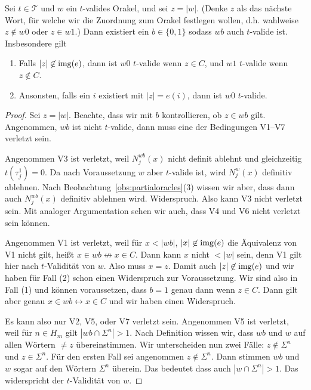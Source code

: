 \begin{lemma}\label{claim:oracle-up-extension}
    Sei $t\in\mathcal T$ und $w$ ein $t$-valides Orakel, und sei $z=|w|$. 
    (Denke $z$ als das nächste Wort, für welche wir die Zuordnung zum Orakel festlegen wollen, d.h. wahlweise $z\not\in w0$ oder $z\in w1$.)
    Dann existiert ein $b\in\{0,1\}$ sodass $wb$ auch $t$-valide ist.
    Insbesondere gilt
    \begin{enumerate}
        \item Falls $|z|\not\in\operatorname{img}(e)$, dann ist $w0$ $t$-valide wenn $z\in C$, und $w1$ $t$-valide wenn $z\not\in C$.
        \item Ansonsten, falls ein $i$ existiert mit $|z|=e(i)$, dann ist $w0$ $t$-valide.
    \end{enumerate}
\end{lemma}
\begin{proof}
    Sei $z=|w|$. Beachte, dass wir mit $b$ kontrollieren, ob $z\in wb$ gilt.
    Angenommen, $wb$ ist nicht $t$-valide, dann muss eine der Bedingungen V1--V7 verletzt sein.

    Angenommen V3 ist verletzt, weil $N_j^{wb}(x)$ nicht definit ablehnt und gleichzeitig $t(\tau_j^1)=0$. Da nach Voraussetzung $w$ aber $t$-valide ist, wird $N_j^{w}(x)$ definitiv ablehnen.
    Nach Beobachtung~\ref{obs:partialoracles}(3) wissen wir aber, dass dann auch $N_j^{wb}(x)$ definitiv ablehnen wird. Widerspruch.
    Also kann V3 nicht verletzt sein. Mit analoger Argumentation sehen wir auch, dass V4 und V6 nicht verletzt sein können.

    Angenommen V1 ist verletzt, weil für $x<|wb|$, $|x|\not\in\operatorname{img}(e)$ die Äquivalenz von V1 nicht gilt, heißt $x\in wb \not\leftrightarrow x\in C$. Dann kann $x$ nicht $<|w|$ sein, denn V1 gilt hier nach $t$-Validität von $w$. Also muss $x=z$.
    Damit auch $|z|\not\in\operatorname{img}(e)$ und wir haben für Fall (2) schon einen Widerspruch zur Voraussetzung.
    Wir sind also in Fall (1) und können voraussetzen, dass $b=1$ genau dann wenn $z\in C$.
    Dann gilt aber genau $x\in wb\leftrightarrow x\in C$ und wir haben einen Widerspruch.

    Es kann also nur V2, V5, oder V7 verletzt sein.
    Angenommen V5 ist verletzt, weil für $n\in H_m$ gilt $|wb\cap\Sigma^n|> 1$.
    Nach Definition wissen wir, dass $wb$ und $w$ auf allen Wörtern $\neq z$ übereinstimmen.
    Wir unterscheiden nun zwei Fälle: $z\not\in\Sigma^n$ und $z\in\Sigma^n$.
    Für den ersten Fall sei angenommen $z\not\in\Sigma^n$. Dann stimmen $wb$ und $w$ sogar auf den Wörtern $\Sigma^n$ überein. Das bedeutet dass auch $|w\cap\Sigma^n|>1$.
    Das widerspricht der $t$-Validität von $w$.


\end{proof}
